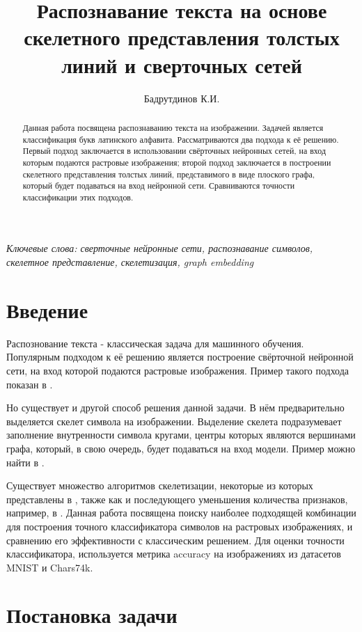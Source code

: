 ﻿\documentclass{llncs}
\title{Распознавание текста на основе скелетного представления толстых линий и сверточных сетей }
\author{Бадрутдинов К.И.}
\institute{Московский физико-технический институт (Государственный университет) \\ \email{badrutdinov.ki@phystech.edu}}
\begin{document}
\maketitle

\begin{abstract}
Данная работа посвящена распознаванию текста на изображении. Задачей является классификация букв латинского алфавита. Рассматриваются два подхода к её решению. Первый подход заключается в использовании свёрточных нейронных сетей, на вход которым подаются растровые изображения; второй подход заключается в построении скелетного представления толстых линий, представимого в виде плоского графа, который будет подаваться на вход нейронной сети. Сравниваются точности классификации этих подходов.
\end{abstract}

\textit{Ключевые слова: сверточные нейронные сети, распознавание символов, скелетное представление, скелетизация, graph embedding}

\section{Введение}

Распознование текста - классическая задача для машинного обучения. Популярным подходом к её решению является построение свёрточной нейронной сети, на вход которой подаются растровые изображения. Пример такого подхода показан в \cite{Ciresan2011}.

Но существует и другой способ решения данной задачи. В нём предварительно выделяется скелет символа на изображении. Выделение скелета подразумевает заполнение внутренности символа кругами, центры которых являются вершинами графа, который, в свою очередь, будет подаваться на вход модели. Пример можно найти в \cite{Waleed2013}.

Существует множество алгоритмов скелетизации, некоторые из которых представлены в \cite{Baranov}, также как и последующего уменьшения количества признаков, например, в \cite{Wang2014} . Данная работа посвящена поиску наиболее подходящей комбинации для построения точного классификатора символов на растровых изображениях, и сравнению его эффективности с классическим решением. Для оценки точности классификатора, используется метрика accuracy на изображениях из датасетов MNIST и Chars74k.

\section{Постановка задачи}
\end{document}
